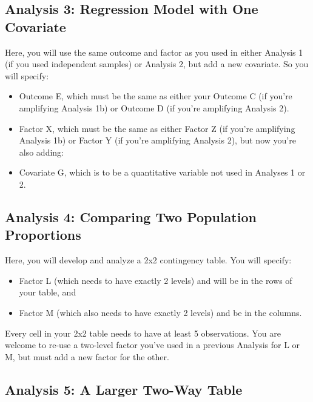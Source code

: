 \documentclass[]{book}
\providecommand{\tightlist}{%
  \setlength{\itemsep}{0pt}\setlength{\parskip}{0pt}}
\theoremstyle{definition}
\theoremstyle{definition}
\theoremstyle{definition}
\theoremstyle{remark}
\begin{document}
\hypertarget{analysis-3-regression-model-with-one-covariate}{%
\subsection{Analysis 3: Regression Model with One
Covariate}\label{analysis-3-regression-model-with-one-covariate}}

Here, you will use the same outcome and factor as you used in either
Analysis 1 (if you used independent samples) or Analysis 2, but add a
new covariate. So you will specify:

\begin{itemize}
\tightlist
\item
  Outcome E, which must be the same as either your Outcome C (if you're
  amplifying Analysis 1b) or Outcome D (if you're amplifying Analysis
  2).
\item
  Factor X, which must be the same as either Factor Z (if you're
  amplifying Analysis 1b) or Factor Y (if you're amplifying Analysis 2),
  but now you're also adding:
\item
  Covariate G, which is to be a quantitative variable not used in
  Analyses 1 or 2.
\end{itemize}

\hypertarget{analysis-4-comparing-two-population-proportions}{%
\subsection{Analysis 4: Comparing Two Population
Proportions}\label{analysis-4-comparing-two-population-proportions}}

Here, you will develop and analyze a 2x2 contingency table. You will
specify:

\begin{itemize}
\tightlist
\item
  Factor L (which needs to have exactly 2 levels) and will be in the
  rows of your table, and
\item
  Factor M (which also needs to have exactly 2 levels) and be in the
  columns.
\end{itemize}

Every cell in your 2x2 table needs to have at least 5 observations. You
are welcome to re-use a two-level factor you've used in a previous
Analysis for L or M, but must add a new factor for the other.

\hypertarget{analysis-5-a-larger-two-way-table}{%
\subsection{Analysis 5: A Larger Two-Way
Table}\label{analysis-5-a-larger-two-way-table}}
\end{document}
